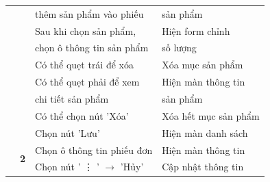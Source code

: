 \documentclass[../DoAn.tex]{subfiles}
\begin{document}
\begin{table}[H]
\begin{tabular}{|l|c|l|l|}
                                                 &                                                                    & thêm sản phẩm vào phiếu                   & sản phẩm                                        \\ \cline{3-4}
                                                 &                                                                    & Sau khi chọn sản phẩm,                    & Hiện form chỉnh                                 \\
                                                 &                                                                    & chọn ô thông tin sản phẩm                 & số lượng                                        \\ \cline{3-4}
                                                 &                                                                    & Có thể quẹt trái để xóa                   & Xóa mục sản phẩm                                \\ \cline{3-4}
                                                 &                                                                    & Có thể quẹt phải để xem                   & Hiện màn thông tin                              \\
                                                 &                                                                    & chi tiết sản phẩm                         & sản phẩm                                        \\ \cline{3-4}
                                                 &                                                                    & Có thể chọn nút 'Xóa'                     & Xóa hết mục sản phẩm                            \\ \cline{3-4}
                                                 &                                                                    & Chọn nút 'Lưu'                            & Hiện màn danh sách                              \\ \cline{2-4}
                                                 & \multirow{2}{*}{\textbf{2}}                                        & Chọn ô thông tin phiếu đơn                & Hiện màn thông tin                              \\ \cline{3-4}
                                                 &                                                                    & Chọn nút ' \vdots{} ' $\rightarrow$ 'Hủy' & Cập nhật thông tin                              \\ \cline{2-4}

\end{tabular}
\end{table}
\end{document}
